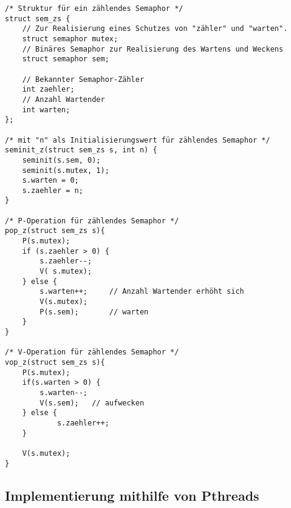\documentclass[11pt,a4paper]{article}
\begin{document}
\begin{lstlisting}
/* Struktur für ein zählendes Semaphor */
struct sem_zs {
	// Zur Realisierung eines Schutzes von "zähler" und "warten".
   	struct semaphor mutex;
	// Binäres Semaphor zur Realisierung des Wartens und Weckens
   	struct semaphor sem; 
   	
	// Bekannter Semaphor-Zähler
	int zaehler;
	// Anzahl Wartender
   	int warten;	
};

/* mit "n" als Initialisierungswert für zählendes Semaphor */
seminit_z(struct sem_zs s, int n) {   
   	seminit(s.sem, 0);
   	seminit(s.mutex, 1);
   	s.warten = 0;
   	s.zaehler = n;
}

/* P-Operation für zählendes Semaphor */
pop_z(struct sem_zs s){		
   	P(s.mutex);
   	if (s.zaehler > 0) {
      	s.zaehler--; 
		V( s.mutex);
   	} else {
      	s.warten++; 	// Anzahl Wartender erhöht sich
      	V(s.mutex);
      	P(s.sem);		// warten
   	}
}

/* V-Operation für zählendes Semaphor */
vop_z(struct sem_zs s){
   	P(s.mutex);
   	if(s.warten > 0) {
      	s.warten--; 
      	V(s.sem);	// aufwecken
  	} else {
     		s.zaehler++;
   	}

   	V(s.mutex);
}
\end{lstlisting}

\subsection{Implementierung mithilfe von Pthreads}
\begin{lstlisting}

\end{lstlisting}
\end{document}
